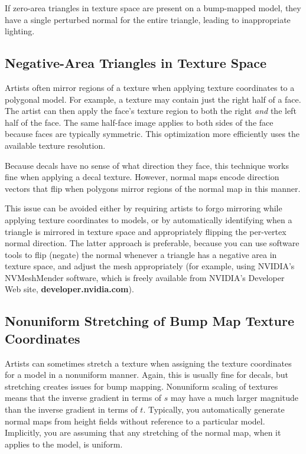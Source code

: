\documentclass[../main.tex]{subfiles}
\begin{document}
If zero-area triangles in texture space are present on a bump-mapped model, they have a single perturbed normal for the entire triangle, leading to inappropriate lighting.

\subsection*{Negative-Area Triangles in Texture Space}

Artists often mirror regions of a texture when applying texture coordinates to a polygonal model. For example, a texture may contain just the right half of a face. The artist can then apply the face's texture region to both the right \textit{and} the left half of the face. The same half-face image applies to both sides of the face because faces are typically symmetric. This optimization more efficiently uses the available texture resolution.

Because decals have no sense of what direction they face, this technique works fine when applying a decal texture. However, normal maps encode direction vectors that flip when polygons mirror regions of the normal map in this manner.

This issue can be avoided either by requiring artists to forgo mirroring while applying texture coordinates to models, or by automatically identifying when a triangle is mirrored in texture space and appropriately flipping the per-vertex normal direction. The latter approach is preferable, because you can use software tools to flip (negate) the normal whenever a triangle has a negative area in texture space, and adjust the mesh appropriately (for example, using NVIDIA's NVMeshMender software, which is freely available from NVIDIA's Developer Web site, \textbf{developer.nvidia.com}).

\subsection*{Nonuniform Stretching of Bump Map Texture Coordinates}

Artists can sometimes stretch a texture when assigning the texture coordinates for a model in a nonuniform manner. Again, this is usually fine for decals, but stretching creates issues for bump mapping. Nonuniform scaling of textures means that the inverse gradient in terms of $s$ may have a much larger magnitude than the inverse gradient in terms of $t$. Typically, you automatically generate normal maps from height fields without reference to a particular model. Implicitly, you are assuming that any stretching of the normal map, when it applies to the model, is uniform.
\end{document}
